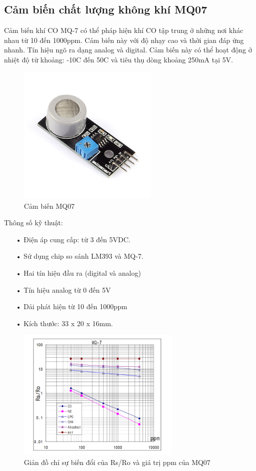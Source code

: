 \subsection*{Cảm biến chất lượng không khí MQ07} 
Cảm biến khí CO MQ-7 có thể pháp hiện khí CO tập trung ở những nơi khác nhau từ 10 đến 1000ppm. Cám biến này với độ nhạy cao và thời gian đáp ứng nhanh. Tín hiệu ngõ ra dạng analog và digital. Cảm biến này có thể hoạt động ở nhiệt độ từ khoảng: -10C đến 50C và tiêu thụ dòng khoảng 250mA tại 5V.
\begin{figure}[H]
\centering    
\includegraphics[width=0.6\textwidth]{mq07}
\caption[Cảm biến MQ07]{Cảm biến MQ07}
\label{fig:mq07}
\end{figure}
Thông số kỹ thuật:
\begin{itemize}
\item[•]Điện áp cung cấp: từ 3 đến 5VDC.
\item[•]Sử dụng chip so sánh LM393 và MQ-7.
\item[•]Hai tín hiệu đầu ra (digital và analog)
\item[•]Tín hiệu analog từ 0 đến 5V 
\item[•]Dải phát hiện từ 10 đến 1000ppm
\item[•]Kích thước: 33 x 20 x 16mm.
\end{itemize}
\begin{figure}[H]
\centering    
\includegraphics[width=0.7\textwidth]{mq07_mqh1}
\caption[Giản đồ chỉ sự biến đổi của Rs/Ro và giá trị ppm của MQ07]{Giản đồ chỉ sự biến đổi của Rs/Ro và giá trị ppm của MQ07}
\label{fig:mq07_mqh1}
\end{figure}


